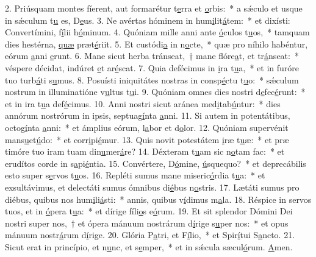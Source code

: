 2. Priúsquam montes fíerent, aut formarétur t\uline{e}rra et \uline{o}rbis:~* a sǽculo et usque in sǽculum t\uline{u} es, D\uline{e}us.
3. Ne avértas hóminem in hum\uline{i}lit\uline{á}tem:~* et dixísti: Convertímini, f\uline{í}lii h\uline{ó}minum.
4. Quóniam mille anni ante \uline{ó}culos t\uline{u}os,~* tamquam dies hestérna, \uline{quæ} præt\uline{é}riit.
5. Et custódi\uline{a} in n\uline{o}cte,~* quæ pro níhilo habéntur, eórum \uline{a}nni \uline{e}runt.
6. Mane sicut herba tránseat,~† mane flóre\uline{a}t, et tr\uline{á}nseat:~* véspere décidat, indúret \uline{e}t ar\uline{é}scat.
7. Quia defécimus in \uline{i}ra t\uline{u}a,~* et in furóre tuo turb\uline{á}ti s\uline{u}mus.
8. Posuísti iniquitátes nostras in consp\uline{é}ctu t\uline{u}o:~* sǽculum nostrum in illuminatióne v\uline{u}ltus t\uline{u}i.
9. Quóniam omnes dies nostri d\uline{e}fec\uline{é}runt:~* et in ira t\uline{u}a def\uline{é}cimus.
10. Anni nostri sicut aránea med\uline{i}tab\uline{ú}ntur:~* dies annórum nostrórum in ipsis, septuag\uline{í}nta \uline{a}nni.
11. Si autem in potentátibus, octog\uline{í}nta \uline{a}nni:~* et ámplius eórum, l\uline{a}bor et d\uline{o}lor.
12. Quóniam supervénit mans\uline{u}et\uline{ú}do:~* et corr\uline{i}pi\uline{é}mur.
13. Quis novit potestátem \uline{i}ræ t\uline{u}æ:~* et præ timóre tuo iram tuam din\uline{u}mer\uline{á}re?
14. Déxteram t\uline{u}am sic n\uline{o}tam fac:~* et erudítos corde in s\uline{a}pi\uline{é}ntia.
15. Convértere, D\uline{ó}mine, \uline{ú}squequo?~* et deprecábilis esto super s\uline{e}rvos t\uline{u}os.
16. Repléti sumus mane miseric\uline{ó}rdia t\uline{u}a:~* et exsultávimus, et delectáti sumus ómnibus di\uline{é}bus n\uline{o}stris.
17. Lætáti sumus pro diébus, quibus nos hum\uline{i}li\uline{á}sti:~* annis, quibus v\uline{í}dimus m\uline{a}la.
18. Réspice in servos tuos, et in \uline{ó}pera t\uline{u}a:~* et dírige fíli\uline{o}s e\uline{ó}rum.
19. Et sit splendor Dómini Dei nostri super nos,~† et ópera mánuum nostrárum d\uline{í}rige s\uline{u}per nos:~* et opus mánuum nostr\uline{á}rum d\uline{í}rige.
20. Glória P\uline{a}tri, et F\uline{í}lio,~* et Spir\uline{í}tui S\uline{a}ncto.
21. Sicut erat in princípio, et n\uline{u}nc, et s\uline{e}mper,~* et in sǽcula sæcul\uline{ó}rum. \uline{A}men.
